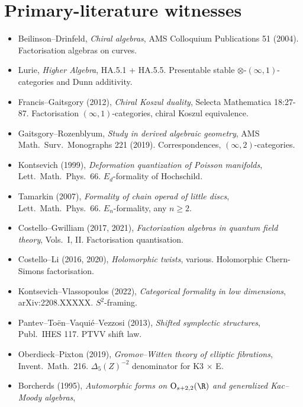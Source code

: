 
\section*{Primary-literature witnesses}

\begin{itemize}
 \item Beilinson--Drinfeld, \emph{Chiral algebras}, AMS Colloquium
 Publications 51 (2004). Factorisation algebras on curves.
 \item Lurie, \emph{Higher Algebra}, HA.5.1 + HA.5.5. Presentable
 stable $\otimes$-$(\infty,1)$-categories and Dunn additivity.
 \item Francis--Gaitsgory (2012), \emph{Chiral Koszul duality}, Selecta
 Mathematica 18:27-87. Factorisation $(\infty,1)$-categories,
 chiral Koszul equivalence.
 \item Gaitsgory--Rozenblyum, \emph{Study in derived algebraic
 geometry}, AMS Math.~Surv.~Monographs 221 (2019). Correspondences,
 $(\infty,2)$-categories.
 \item Kontsevich (1999), \emph{Deformation quantization of Poisson
 manifolds}, Lett.~Math.~Phys.~66. $E_d$-formality of Hochschild.
 \item Tamarkin (2007), \emph{Formality of chain operad of little
 discs}, Lett.~Math.~Phys.~66. $E_n$-formality, any $n\geq 2$.
 \item Costello--Gwilliam (2017, 2021), \emph{Factorization algebras
 in quantum field theory}, Vols.~I, II. Factorisation
 quantisation.
 \item Costello--Li (2016, 2020), \emph{Holomorphic twists}, various.
 Holomorphic Chern-Simons factorisation.
 \item Kontsevich--Vlassopoulos (2022), \emph{Categorical
 formality in low dimensions}, arXiv:2208.XXXXX. $S^2$-framing.
 \item Pantev--To\"en--Vaqui\'e--Vezzosi (2013), \emph{Shifted
 symplectic structures}, Publ.~IHES 117. PTVV shift law.
 \item Oberdieck--Pixton (2019), \emph{Gromov--Witten theory of elliptic
 fibrations}, Invent.\ Math.~216. $\Delta_5(Z)^{-2}$ denominator
 for K3 $\times$ E.
 \item Borcherds (1995), \emph{Automorphic forms on
 $\mathrm{O}_{s+2,2}(\R)$ and generalized Kac--Moody algebras},

\end{itemize}
